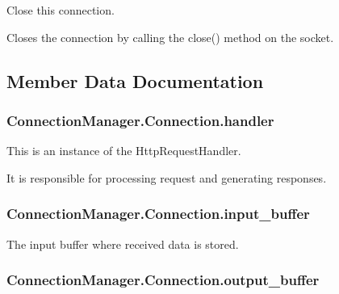 Close this connection. 

Closes the connection by calling the close() method on the socket. 

\subsection{Member Data Documentation}
\hypertarget{class_connection_manager_1_1_connection_a36948dfdd00bb9b1f3d8246c874238a9}{
\subsubsection[{handler}]{\setlength{\rightskip}{0pt plus 5cm}Connection\-Manager.\-Connection.\-handler}}\label{class_connection_manager_1_1_connection_a36948dfdd00bb9b1f3d8246c874238a9}


This is an instance of the Http\-Request\-Handler. 

It is responsible for processing request and generating responses. \hypertarget{class_connection_manager_1_1_connection_a6363bfbd5eb310be1d9d8f8f3c316a64}{
\subsubsection[{input\-\_\-buffer}]{\setlength{\rightskip}{0pt plus 5cm}Connection\-Manager.\-Connection.\-input\-\_\-buffer}}\label{class_connection_manager_1_1_connection_a6363bfbd5eb310be1d9d8f8f3c316a64}


The input buffer where received data is stored. 

\hypertarget{class_connection_manager_1_1_connection_a3dcce4ca0299bef196ffb49ab2795330}{
\subsubsection[{output\-\_\-buffer}]{\setlength{\rightskip}{0pt plus 5cm}Connection\-Manager.\-Connection.\-output\-\_\-buffer}}\label{class_connection_manager_1_1_connection_a3dcce4ca0299bef196ffb49ab2795330}


